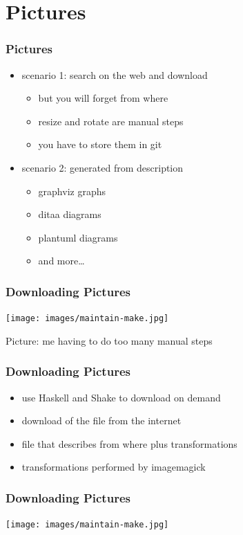 \documentclass{beamer}
\begin{document}
\section{Pictures}

\begin{frame}
  \frametitle{Pictures}
  \begin{itemize}
  \item scenario 1: search on the web and download
    \begin{itemize}
    \item but you will forget from where
    \item resize and rotate are manual steps
    \item you have to store them in git
    \end{itemize}
  \item scenario 2: generated from description
    \begin{itemize}
    \item graphviz graphs
    \item ditaa diagrams
    \item plantuml diagrams
    \item and more\ldots{}
    \end{itemize}
  \end{itemize}
\end{frame}

\begin{frame}
  \frametitle{Downloading Pictures}
  \begin{center}
    \texttt{[image: images/maintain-make.jpg]}
  \end{center}
  {\small{Picture: me having to do too many manual steps}}
\end{frame}

\begin{frame}
  \frametitle{Downloading Pictures}
  \begin{itemize}
  \item use Haskell and Shake to download on demand
  \item download of the file from the internet
  \item file that describes from where plus transformations
  \item transformations performed by imagemagick
  \end{itemize}
\end{frame}

\begin{frame}
  \frametitle{Downloading Pictures}
  \begin{center}
    \texttt{[image: images/maintain-make.jpg]}
    \inputminted{text}{images/maintain-make.src}
  \end{center}
\end{frame}
\end{document}
